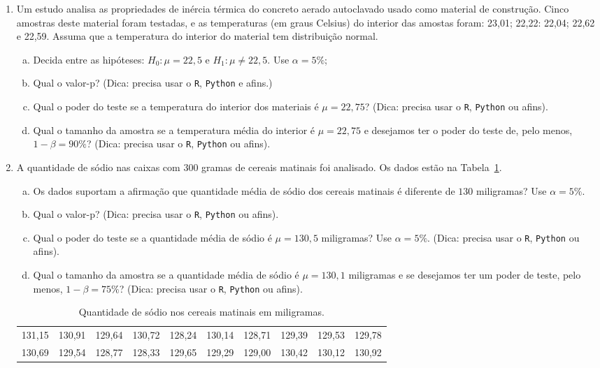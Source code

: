 \documentclass[12pt, a4paper]{article}
\begin{document}
\begin{enumerate}
	\item Um estudo analisa as propriedades de inércia térmica do concreto aerado autoclavado usado como material de construção. Cinco amostras deste material foram testadas, e as temperaturas (em graus Celsius) do interior das amostas foram:  23,01; 22,22: 22,04; 22,62 e 22,59. Assuma que a temperatura do interior do material tem distribuição normal.
	\begin{enumerate}[(a)]
		\item Decida entre as hipóteses: $H_0: \mu = 22,5$ e $H_1: \mu \neq 22,5$. Use $\alpha=5\%$;
		\item Qual o valor-p? (Dica: precisa usar o \texttt{R}, \texttt{Python} e afins.)
		\item Qual o poder do teste se a temperatura do interior dos materiais é $\mu = 22,75$? (Dica: precisa usar o \texttt{R}, \texttt{Python} ou afins).
		\item Qual o tamanho da amostra se a temperatura média do interior é $\mu = 22,75$ e desejamos ter o poder do teste de, pelo menos, $1-\beta = 90\%$? (Dica: precisa usar o \texttt{R}, \texttt{Python} ou afins).
	\end{enumerate}

	\item A quantidade de sódio nas caixas com $300$ gramas de cereais matinais foi analisado. Os dados estão na Tabela~\ref{tab:cereal-matinal}.
	\begin{enumerate}[(a)]
		\item Os dados suportam a afirmação que quantidade média de sódio dos cereais matinais é diferente de $130$ miligramas? Use $\alpha=5\%$.
		\item Qual o valor-p? (Dica: precisa usar o \texttt{R}, \texttt{Python} ou afins).
		\item Qual o poder do teste se a quantidade média de sódio é $\mu = 130,5$ miligramas? Use $\alpha=5\%$. (Dica: precisa usar o \texttt{R}, \texttt{Python} ou afins).
		\item Qual o tamanho da amostra se a quantidade média de sódio é $\mu=130,1$ miligramas e se desejamos ter um poder de teste, pelo menos, $1-\beta = 75\%$? (Dica: precisa usar o \texttt{R}, \texttt{Python} ou afins).
	\end{enumerate}
	\begin{table}[ht]
		\centering
		\begin{tabular}{cccccccccc}
			\toprule[0.05cm]
			131,15 & 130,91 & 129,64 & 130,72 & 128,24 & 130,14 & 128,71 & 129,39 & 129,53 & 129,78 \\ 
			130,69 & 129,54 & 128,77 & 128,33 & 129,65 & 129,29 & 129,00 & 130,42 & 130,12 & 130,92 \\ 
			\bottomrule[0.05cm]
		\end{tabular}
		\caption{Quantidade de sódio nos cereais matinais em miligramas.} 
		\label{tab:cereal-matinal}
	\end{table}


\end{enumerate}
\end{document}
